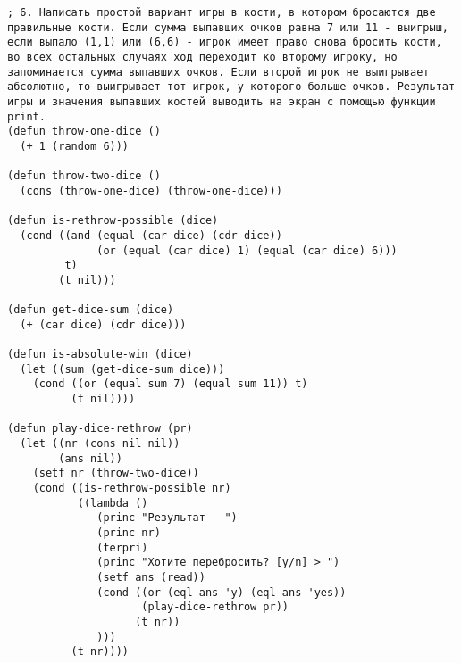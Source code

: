 \documentclass[a4paper,oneside,14pt]{extarticle}
\begin{document}
\begin{lstlisting}
; 6. Написать простой вариант игры в кости, в котором бросаются две правильные кости. Если сумма выпавших очков равна 7 или 11 - выигрыш, если выпало (1,1) или (6,6) - игрок имеет право снова бросить кости, во всех остальных случаях ход переходит ко второму игроку, но запоминается сумма выпавших очков. Если второй игрок не выигрывает абсолютно, то выигрывает тот игрок, у которого больше очков. Результат игры и значения выпавших костей выводить на экран с помощью функции print.
(defun throw-one-dice ()
  (+ 1 (random 6)))

(defun throw-two-dice ()
  (cons (throw-one-dice) (throw-one-dice)))

(defun is-rethrow-possible (dice)
  (cond ((and (equal (car dice) (cdr dice))
              (or (equal (car dice) 1) (equal (car dice) 6)))
         t)
        (t nil)))

(defun get-dice-sum (dice)
  (+ (car dice) (cdr dice)))

(defun is-absolute-win (dice)
  (let ((sum (get-dice-sum dice)))
    (cond ((or (equal sum 7) (equal sum 11)) t)
          (t nil))))

(defun play-dice-rethrow (pr)
  (let ((nr (cons nil nil))
        (ans nil))
    (setf nr (throw-two-dice))
    (cond ((is-rethrow-possible nr)
           ((lambda ()
              (princ "Результат - ")
              (princ nr)
              (terpri)
              (princ "Хотите перебросить? [y/n] > ")
              (setf ans (read))
              (cond ((or (eql ans 'y) (eql ans 'yes))
                     (play-dice-rethrow pr))
                    (t nr))
              )))
          (t nr))))


\end{lstlisting}
\end{document}
